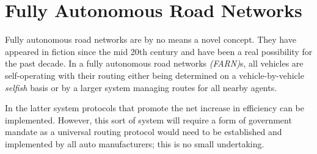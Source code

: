 
\section{Fully Autonomous Road Networks}

Fully autonomous road networks are by no means a novel concept. They have appeared in fiction since the mid 20th century and have been a real possibility for the past decade. In a fully autonomous road networks \textit{(FARN)}s, all vehicles are self-operating with their routing either being determined on a vehicle-by-vehicle \textit{selfish} basis or by a larger system managing routes for all nearby agents. 

In the latter system protocols that promote the net increase in efficiency can be implemented. However, this sort of system will require a form of government mandate as a universal routing protocol would need to be established and implemented by all auto manufacturers; this is no small undertaking.


